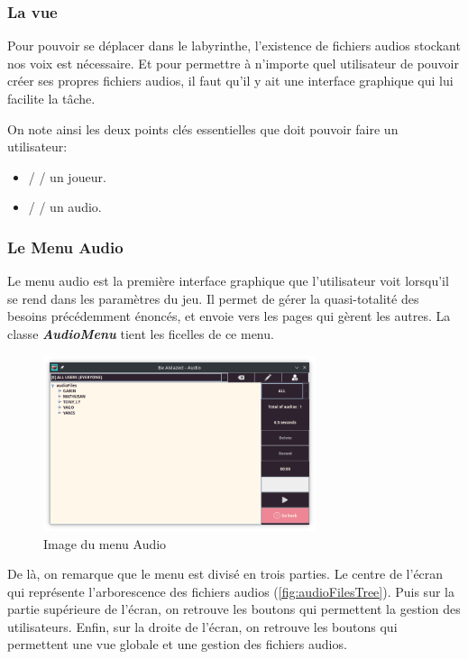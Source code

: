 \subsubsection{La vue}
\label{subsubsec:sonVue}

Pour pouvoir se déplacer dans le labyrinthe, l'existence de fichiers audios
stockant nos voix est nécessaire. Et pour permettre à n'importe quel
utilisateur de pouvoir créer ses propres fichiers audios, il faut qu'il y ait
une interface graphique qui lui facilite la tâche.

On note ainsi les deux points clés essentielles que doit pouvoir faire un
utilisateur:
\begin{itemize}
    \item{     /  /  un joueur.}
    \item{ /   /  un audio.}
\end{itemize}

\subsubsection*{Le Menu Audio}
\label{subsubsec:AudioMenu}

Le menu audio est la première interface graphique que l'utilisateur voit
lorsqu'il se rend dans les paramètres du jeu. Il permet de gérer la
quasi-totalité des besoins précédemment énoncés, et envoie vers les pages
qui gèrent les autres.
La classe \textbf{\textit{AudioMenu}} tient les ficelles de ce menu.

\begin{figure}[!htb]
    \centering
    \includegraphics[width=8cm]{ressources/Implementation/Son/AudioMenu.png}%
    \caption{Image du menu Audio}%
    \label{fig:AudioMenu}
\end{figure}

De là, on remarque que le menu est divisé en trois parties.
Le centre de l'écran qui représente l'arborescence des fichiers audios
(\ref{fig:audioFilesTree}).
Puis sur la partie supérieure de l'écran, on retrouve les boutons qui
permettent la gestion des utilisateurs.
Enfin, sur la droite de l'écran, on retrouve les boutons qui permettent une vue
globale et une gestion des fichiers audios.

